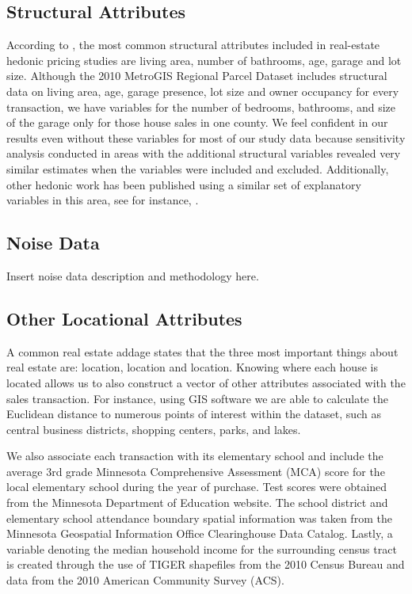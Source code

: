 \documentclass{article}\usepackage{graphicx, color}
\begin{document}
\subsection{Structural Attributes}
According to \cite{Wilhelmsson2000}, the most common structural attributes included in real-estate hedonic pricing studies are living area, number of bathrooms, age, garage and lot size.  Although the 2010 MetroGIS Regional Parcel Dataset includes structural data on living area, age, garage presence, lot size and owner occupancy for every transaction, we have variables for the number of bedrooms, bathrooms, and size of the garage only for those house sales in one county. We feel confident in our results even without these variables for most of our study data because sensitivity analysis conducted in areas with the additional structural variables revealed very similar estimates when the variables were included and excluded. Additionally, other hedonic work has been published using a similar set of explanatory variables in this area, see for instance, \citet{Sander2009b}.

\subsection{Noise Data}
Insert noise data description and methodology here. 

\subsection{Other Locational Attributes}
A common real estate addage states that the three most important things about real estate are: location, location and location. Knowing where each house is located allows us to also construct a vector of other attributes associated with the sales transaction. For instance, using GIS software we are able to calculate the Euclidean distance to numerous points of interest within the dataset, such as central business districts, shopping centers, parks, and lakes. 

We also associate each transaction with its elementary school and include the average 3rd grade Minnesota Comprehensive Assessment (MCA) score for the local elementary school during the year of purchase. Test scores were obtained from the Minnesota Department of Education website. The school district and elementary school attendance boundary spatial information was taken from the Minnesota Geospatial Information Office Clearinghouse Data Catalog. Lastly, a variable denoting the median household income for the surrounding census tract is created through the use of TIGER shapefiles from the 2010 Census Bureau and data from the 2010 American Community Survey (ACS). 
\end{document}
